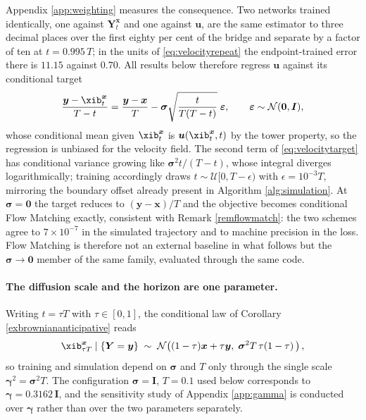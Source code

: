 Appendix \ref{app:weighting} measures the consequence. Two networks trained
identically, one against $\boldsymbol{Y}^{\boldsymbol{x}}_t$ and one against
$\boldsymbol{u}$, are the same estimator to three decimal places over the first
eighty per cent of the bridge and separate by a factor of ten at $t = 0.995\,T$;
in the units of \eqref{eq:velocityrepeat} the endpoint-trained error there is
$11.15$ against $0.70$. All results below therefore regress $\boldsymbol{u}$
against its conditional target
\begin{align}
\frac{\boldsymbol{y} - \xib^{\boldsymbol{x}}_t}{T-t}
= \frac{\boldsymbol{y}-\boldsymbol{x}}{T}
- \boldsymbol{\sigma}\sqrt{\frac{t}{T(T-t)}}\;\boldsymbol{\varepsilon},
\qquad \boldsymbol{\varepsilon}\sim\mathcal{N}(\boldsymbol{0},\boldsymbol{I}),
\label{eq:velocitytarget}
\end{align}
whose conditional mean given $\xib^{\boldsymbol{x}}_t$ is
$\boldsymbol{u}(\xib^{\boldsymbol{x}}_t,t)$ by the tower property, so the
regression is unbiased for the velocity field. The second term of
\eqref{eq:velocitytarget} has conditional variance growing like
$\boldsymbol{\sigma}^2 t/(T-t)$, whose integral diverges logarithmically;
training accordingly draws $t\sim\mathcal{U}[0,T-\epsilon)$ with
$\epsilon = 10^{-3}T$, mirroring the boundary offset already present in
Algorithm \ref{alg:simulation}. At $\boldsymbol{\sigma}=\boldsymbol{0}$ the
target reduces to $(\boldsymbol{y}-\boldsymbol{x})/T$ and the objective becomes
conditional Flow Matching exactly, consistent with Remark \ref{remflowmatch}:
the two schemes agree to $7\times10^{-7}$ in the simulated trajectory and to
machine precision in the loss. Flow Matching is therefore not an external
baseline in what follows but the $\boldsymbol{\sigma}\to\boldsymbol{0}$ member of
the same family, evaluated through the same code.

\paragraph{The diffusion scale and the horizon are one parameter.} Writing
$t = \tau T$ with $\tau\in[0,1]$, the conditional law of Corollary
\ref{exbrowniananticipative} reads
\begin{align}
\xib^{\boldsymbol{x}}_{\tau T} \mid \{\boldsymbol{Y}=\boldsymbol{y}\}
\;\sim\; \mathcal{N}\!\left( (1-\tau)\boldsymbol{x} + \tau\boldsymbol{y},\;
\boldsymbol{\sigma}^2 T\,\tau(1-\tau)\,\right), \notag
\end{align}
so training and simulation depend on $\boldsymbol{\sigma}$ and $T$ only through
the single scale $\boldsymbol{\gamma}^2 = \boldsymbol{\sigma}^2 T$. The
configuration $\boldsymbol{\sigma}=\boldsymbol{I}$, $T=0.1$ used below
corresponds to $\boldsymbol{\gamma} = 0.3162\,\boldsymbol{I}$, and the
sensitivity study of Appendix \ref{app:gamma} is conducted over
$\boldsymbol{\gamma}$ rather than over the two parameters separately.

